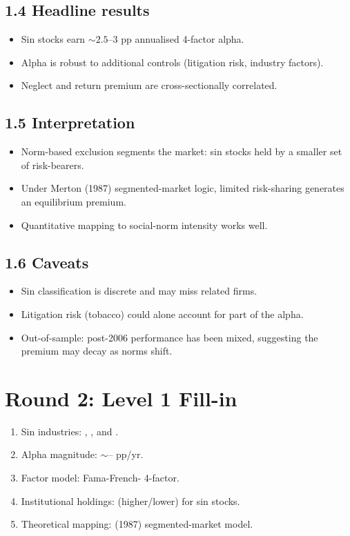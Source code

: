 \documentclass[11pt]{article}
\newcommand{\blank}[1]{\underline{\hspace{#1}}}
\begin{document}
\subsection*{1.4 Headline results}
\begin{itemize}
\item Sin stocks earn $\sim 2.5$--$3$ pp annualised 4-factor alpha.
\item Alpha is robust to additional controls (litigation risk, industry factors).
\item Neglect and return premium are cross-sectionally correlated.
\end{itemize}

\subsection*{1.5 Interpretation}
\begin{itemize}
\item Norm-based exclusion segments the market: sin stocks held by a smaller set of risk-bearers.
\item Under Merton (1987) segmented-market logic, limited risk-sharing generates an equilibrium premium.
\item Quantitative mapping to social-norm intensity works well.
\end{itemize}

\subsection*{1.6 Caveats}
\begin{alertbox}
\begin{itemize}
\item Sin classification is discrete and may miss related firms.
\item Litigation risk (tobacco) could alone account for part of the alpha.
\item Out-of-sample: post-2006 performance has been mixed, suggesting the premium may decay as norms shift.
\end{itemize}
\end{alertbox}

\section*{Round 2: Level 1 Fill-in}
\begin{enumerate}
\item Sin industries: \blank{1cm}, \blank{1cm}, and \blank{1cm}.
\item Alpha magnitude: $\sim$\blank{1cm}--\blank{1cm} pp/yr.
\item Factor model: Fama-French-\blank{1cm} 4-factor.
\item Institutional holdings: \blank{1cm} (higher/lower) for sin stocks.
\item Theoretical mapping: \blank{1cm} (1987) segmented-market model.
\end{enumerate}
\end{document}
